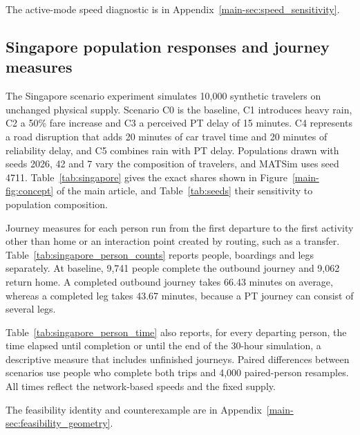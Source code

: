 The active-mode speed diagnostic is in Appendix~\ref{main-sec:speed_sensitivity}.

\subsection{Singapore population responses and journey measures}
The Singapore scenario experiment simulates 10,000 synthetic travelers on unchanged physical supply. Scenario C0 is the baseline, C1 introduces heavy rain, C2 a 50\% fare increase and C3 a perceived PT delay of 15 minutes. C4 represents a road disruption that adds 20 minutes of car travel time and 20 minutes of reliability delay, and C5 combines rain with PT delay. Populations drawn with seeds 2026, 42 and 7 vary the composition of travelers, and MATSim uses seed 4711. Table~\ref{tab:singapore} gives the exact shares shown in Figure~\ref{main-fig:concept} of the main article, and Table~\ref{tab:seeds} their sensitivity to population composition.


Journey measures for each person run from the first departure to the first activity other than home or an interaction point created by routing, such as a transfer. Table~\ref{tab:singapore_person_counts} reports people, boardings and legs separately. At baseline, 9,741 people complete the outbound journey and 9,062 return home. A completed outbound journey takes 66.43 minutes on average, whereas a completed leg takes 43.67 minutes, because a PT journey can consist of several legs.

Table~\ref{tab:singapore_person_time} also reports, for every departing person, the time elapsed until completion or until the end of the 30-hour simulation, a descriptive measure that includes unfinished journeys. Paired differences between scenarios use people who complete both trips and 4,000 paired-person resamples. All times reflect the network-based speeds and the fixed supply.


\FloatBarrier

The feasibility identity and counterexample are in Appendix~\ref{main-sec:feasibility_geometry}.
